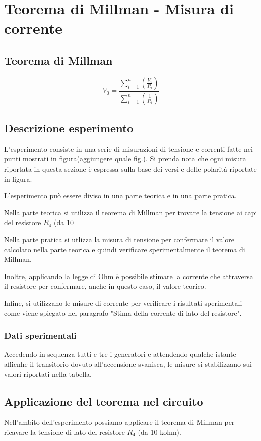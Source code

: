 \documentclass{article}
\begin{document}
\section{Teorema di Millman - Misura di corrente}

\subsection{Teorema di Millman}
\[V_0 = \frac{\sum_{i=1}^{n} \left(\frac{V_i}{R_i}\right)}{\sum_{i=1}^{n} \left( \frac{1}{R_i}\right)}\]

\subsection{Descrizione esperimento}
L'esperimento consiste in una serie di misurazioni di tensione e correnti fatte nei punti mostrati in figura(aggiungere quale fig.).
Si prenda nota che ogni misura riportata in questa sezione è espressa sulla base dei versi e delle polarità riportate in figura.

L'esperimento può essere diviso in una parte teorica e in una parte pratica.

Nella parte teorica si utilizza il teorema di Millman per trovare la tensione ai capi del resistore \(R_4\) (da 10 %

Nella parte pratica si utlizza la misura di tensione per confermare il valore calcolato nella parte teorica
e quindi verificare sperimentalmente il teorema di Millman.

Inoltre, applicando la legge di Ohm è possibile stimare la corrente che attraversa il resistore per confermare, anche in questo caso, il valore teorico.

Infine, si utilizzano le misure di corrente per verificare i risultati sperimentali come viene spiegato nel paragrafo "Stima della corrente di lato del resistore".

\subsubsection{Dati sperimentali}

Accedendo in sequenza tutti e tre i generatori e attendendo qualche istante afficnhe il transitorio dovuto all'accensione svanisca, le misure si stabilizzano sui valori riportati nella tabella.
\subsection{Applicazione del teorema nel circuito}
Nell'ambito dell'esperimento possiamo applicare il teorema di Millman per ricavare la tensione di lato del resistore \(R_4\) (da 10 kohm).
\end{document}

